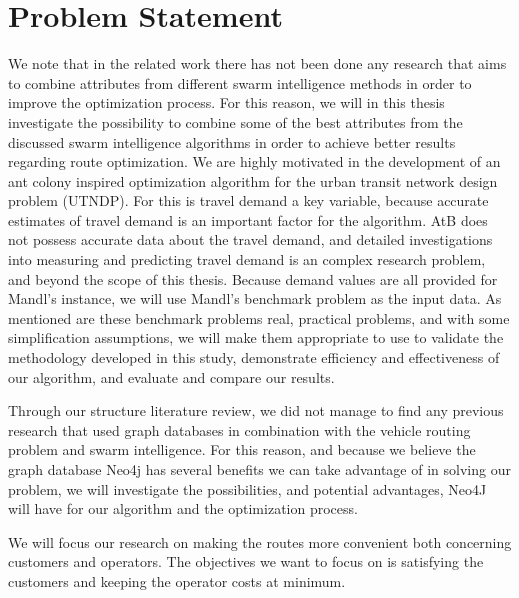 \section{Problem Statement} 

We note that in the related work there has not been done any research that aims to combine attributes from different swarm intelligence methods in order to improve the optimization process. For this reason, we will in this thesis investigate the possibility to combine some of the best attributes from the discussed swarm intelligence algorithms in order to achieve better results regarding route optimization. We are highly motivated in the development of an ant colony inspired optimization algorithm for the urban transit network design problem (UTNDP). For this is travel demand a key variable, because accurate estimates of travel demand is an important factor for the algorithm. AtB does not possess accurate data about the travel demand, and detailed investigations into measuring and predicting travel demand is an complex research problem, and beyond the scope of this thesis. Because demand values are all provided for Mandl's instance, we will use Mandl's benchmark problem \citep{mandl79} as the input data. %
As mentioned are these benchmark problems real, practical problems, and with some simplification assumptions, we will make them appropriate to use to validate the methodology developed in this study, demonstrate efficiency and effectiveness of our algorithm, and evaluate and compare our results. 

Through our structure literature review, we did not manage to find any previous research that used graph databases in combination with the vehicle routing problem and swarm intelligence. For this reason, and because we believe the graph database Neo4j \citep{website:neo4j} has several benefits we can take advantage of in solving our problem, we will investigate the possibilities, and potential advantages, Neo4J will have for our algorithm and the optimization process. 

We will focus our research on making the routes more convenient both concerning customers and operators. The objectives we want to focus on is satisfying the customers and keeping the operator costs at minimum. 

